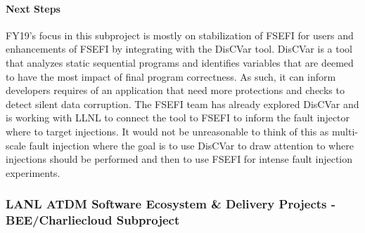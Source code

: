 
\paragraph{Next Steps}
FY19's focus in this subproject is mostly on stabilization of FSEFI for users
and enhancements of FSEFI by integrating with the
DisCVar\cite{DBLP:conf-ppopp-MenonM18} tool.  DisCVar is a tool that analyzes
static sequential programs and identifies variables that are deemed to have the
most impact of final program correctness.  As such, it can inform developers
requires of an application that need more protections and checks to detect
silent data corruption.  The FSEFI team has already explored DisCVar and is
working with LLNL to connect the tool to FSEFI to inform the fault injector
where to target injections.  It would not be unreasonable to think of this as
multi-scale fault injection where the goal is to use DisCVar to draw attention
to where injections should be performed and then to use FSEFI for intense fault
injection experiments.

\subsubsection{LANL ATDM Software Ecosystem \& Delivery Projects - BEE/Charliecloud Subproject} 

